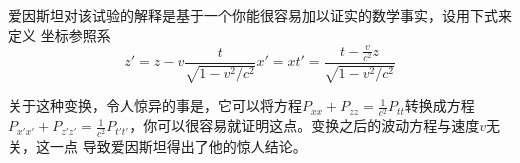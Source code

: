 爱因斯坦对该试验的解释是基于一个你能很容易加以证实的数学事实，设用下式来定义
坐标参照系
\begin{subequations}
\begin{equation}
z'=z-v\frac{t}{\sqrt{1-v^2/c^2}}
\label{eq:ex2.6.14a}
\end{equation}
\begin{equation}
x'=x
\label{eq:ex2.6.14b}
\end{equation}
\begin{equation}
t'=\frac{t-\frac{v}{c^2}z}{\sqrt{1-v^2/c^2}}
\label{eq:ex2.6.14c}
\end{equation}
\end{subequations}

关于这种变换，令人惊异的事是，它可以将方程$P_{xx}+P_{zz}=\frac{1}{c^2}P_{tt}$转换成方程$P_{x'x'}+P_{z'z'}=\frac{1}{c^2}P_{t't'}$，你可以很容易就证明这点。变换之后的波动方程与速度$v$无关，这一点
导致爱因斯坦得出了他的惊人结论。
